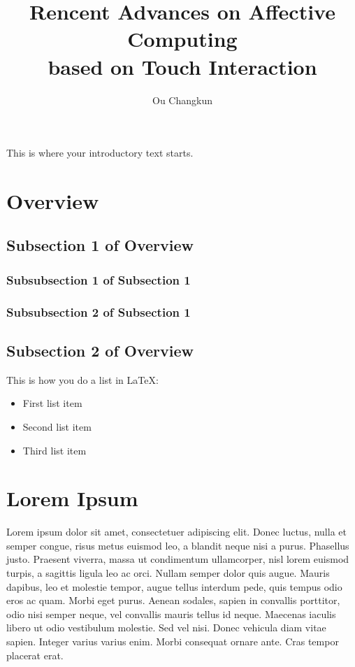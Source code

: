\documentclass[journal]{vgtc}                %
\title{Rencent Advances on Affective Computing \\based on Touch Interaction}
\author{Ou Changkun}
\begin{document}

\maketitle

%
%

This is where your introductory text starts.

\section{Overview}

\subsection{Subsection 1 of Overview}

\subsubsection{Subsubsection 1 of Subsection 1}

\subsubsection{Subsubsection 2 of Subsection 1}

\subsection{Subsection 2 of Overview}

This is how you do a list in LaTeX:
\begin{itemize}
\item First list item
\item Second list item
\item Third list item
\end{itemize}

\section{Lorem Ipsum}
Lorem ipsum dolor sit amet, consectetuer adipiscing elit. Donec luctus, nulla et semper congue, risus metus euismod leo, a blandit neque nisi a purus. Phasellus justo. Praesent viverra, massa ut condimentum ullamcorper, nisl lorem euismod turpis, a sagittis ligula leo ac orci. Nullam semper dolor quis augue. Mauris dapibus, leo et molestie tempor, augue tellus interdum pede, quis tempus odio eros ac quam. Morbi eget purus. Aenean sodales, sapien in convallis porttitor, odio nisi semper neque, vel convallis mauris tellus id neque. Maecenas iaculis libero ut odio vestibulum molestie. Sed vel nisi. Donec vehicula diam vitae sapien. Integer varius varius enim. Morbi consequat ornare ante. Cras tempor placerat erat.
\end{document}
